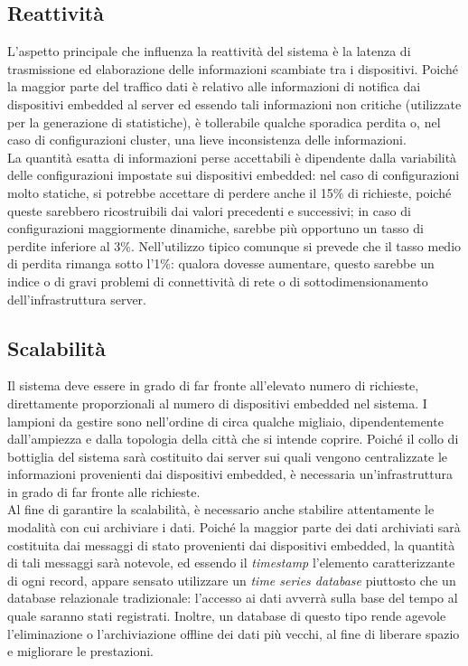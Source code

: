 \subsection{Reattività}
L'aspetto principale che influenza la reattività del sistema è la latenza di trasmissione ed elaborazione delle informazioni scambiate tra i dispositivi.
Poiché la maggior parte del traffico dati è relativo alle informazioni di notifica dai dispositivi embedded al server ed essendo tali informazioni non critiche (utilizzate per la generazione di statistiche), è tollerabile qualche sporadica perdita o, nel caso di configurazioni cluster, una lieve inconsistenza delle informazioni.
\\La quantità esatta di informazioni perse accettabili è dipendente dalla variabilità delle configurazioni impostate sui dispositivi embedded: nel caso di configurazioni molto statiche, si potrebbe accettare di perdere anche il 15\% di richieste, poiché queste sarebbero ricostruibili dai valori precedenti e successivi; in caso di configurazioni maggiormente dinamiche, sarebbe più opportuno un tasso di perdite inferiore al 3\%.
Nell’utilizzo tipico comunque si prevede che il tasso medio di perdita rimanga sotto l’1\%: qualora dovesse aumentare, questo sarebbe un indice o di gravi problemi di connettività di rete o di sottodimensionamento dell'infrastruttura server.

\subsection{Scalabilità}
Il sistema deve essere in grado di far fronte all'elevato numero di richieste, direttamente proporzionali al numero di dispositivi embedded nel sistema.
I lampioni da gestire sono nell'ordine di circa qualche migliaio, dipendentemente dall'ampiezza e dalla topologia della città che si intende coprire.
Poiché il collo di bottiglia del sistema sarà costituito dai server sui quali vengono centralizzate le informazioni provenienti dai dispositivi embedded, è necessaria un'infrastruttura in grado di far fronte alle richieste.
\\Al fine di garantire la scalabilità, è necessario anche stabilire attentamente le modalità con cui archiviare i dati.
Poiché la maggior parte dei dati archiviati sarà costituita dai messaggi di stato provenienti dai dispositivi embedded, la quantità di tali messaggi sarà notevole, ed essendo il \textit{timestamp} l'elemento caratterizzante di ogni record, appare sensato utilizzare un \textit{time series database} piuttosto che un database relazionale tradizionale: l'accesso ai dati avverrà sulla base del tempo al quale saranno stati registrati.
Inoltre, un database di questo tipo rende agevole l'eliminazione o l'archiviazione offline dei dati più vecchi, al fine di liberare spazio e migliorare le prestazioni.

